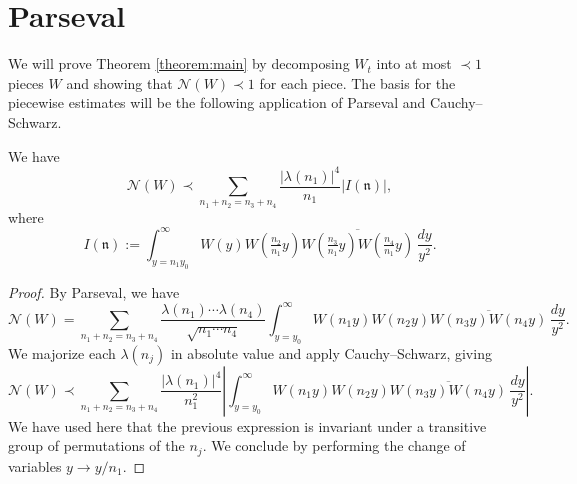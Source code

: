 \documentclass[reqno]{amsart} 
\begin{document}
\section{Parseval}
We will prove Theorem \ref{theorem:main} by decomposing $W_t$ into at most $\prec 1$ pieces $W$ and showing that $\mathcal{N}(W) \prec 1$ for each piece.  The basis for the piecewise estimates will be the following application of Parseval and Cauchy--Schwarz.
\begin{lemma}\label{lemma:unfolding}
  We have
  \begin{equation*}
    \mathcal{N}(W) \prec
    \sum _{n_1 + n_2 = n_3 + n_4}
    \frac{\left\lvert \lambda(n_1) \right\rvert^4}{n_1} \left\lvert I(\mathfrak{n}) \right\rvert,
  \end{equation*}
  where
  \begin{equation}\label{equation:definition-of-I-of-n}
    I(\mathfrak{n}) :=
    \int _{y = n_1 y _0 } ^\infty W (y ) W (\tfrac{n_2}{n _1} y) \overline{W (\tfrac{n _3 }{ n _1 } y) W (\tfrac{n _4}{n_1} y)} \, \frac{d y}{y^2}.
  \end{equation}
\end{lemma}
\begin{proof}
  By Parseval, we have
  \begin{equation*}
    \mathcal{N}(W) = \sum _{n _1 + n _2 = n _3 + n _4 }
    \frac{\lambda (n _1) \dotsb \lambda (n _4 )}{\sqrt{n _1 \dotsb n _4 }}
    \int _{y = y _0 } ^\infty
    W (n _1 y)
    W (n _2 y)
    \overline{W (n _3 y)
      W (n _4 y)}
    \, \frac{d y}{ y ^2 }.
  \end{equation*}
  We majorize each $\lambda(n_j)$ in absolute value and apply Cauchy--Schwarz, giving
  \begin{equation*}
    \mathcal{N}(W) \prec
    \sum _{n_1 + n_2 = n_3 + n_4}
    \frac{\left\lvert \lambda(n_1) \right\rvert^4}{n_1^2}
    \left\lvert
      \int _{y = y _0 } ^\infty W (n _1 y ) W (n _2 y) \overline{W (n _3 y) W (n _4 y)} \, \frac{d y}{y^2}
    \right\rvert.
  \end{equation*}
  We have used here that the previous expression is invariant under a transitive group of permutations of the $n_j$.  We conclude by performing the change of variables $y \rightarrow y / n_1$.
\end{proof}
\end{document}
